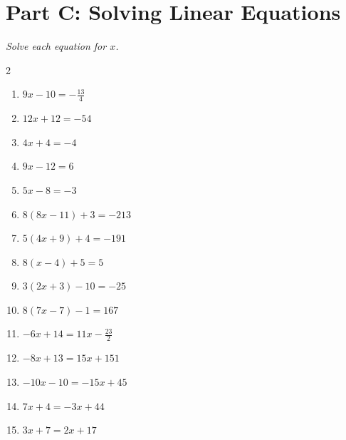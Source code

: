 \documentclass[11pt]{article}
\begin{document}
\section*{Part C: Solving Linear Equations}
\noindent\textit{Solve each equation for $x$.}
\begin{multicols}{2}
\begin{enumerate}
  \item $9x - 10 = -\frac{13}{4}$
  \vspace{1.8cm}
  \item $12x + 12 = -54$
  \vspace{1.8cm}
  \item $4x + 4 = -4$
  \vspace{1.8cm}
  \item $9x - 12 = 6$
  \vspace{1.8cm}
  \item $5x - 8 = -3$
  \vspace{1.8cm}
  \item $8(8x - 11) + 3 = -213$
  \vspace{1.8cm}
  \item $5(4x + 9) + 4 = -191$
  \vspace{1.8cm}
  \item $8(x - 4) + 5 = 5$
  \vspace{1.8cm}
  \item $3(2x + 3) - 10 = -25$
  \vspace{1.8cm}
  \item $8(7x - 7) - 1 = 167$
  \vspace{1.8cm}
  \item $-6x + 14 = 11x - \frac{23}{2}$
  \vspace{1.8cm}
  \item $-8x + 13 = 15x + 151$
  \vspace{1.8cm}
  \item $-10x - 10 = -15x + 45$
  \vspace{1.8cm}
  \item $7x + 4 = -3x + 44$
  \vspace{1.8cm}
  \item $3x + 7 = 2x + 17$
  \vspace{1.8cm}
\end{enumerate}
\end{multicols}
\end{document}
